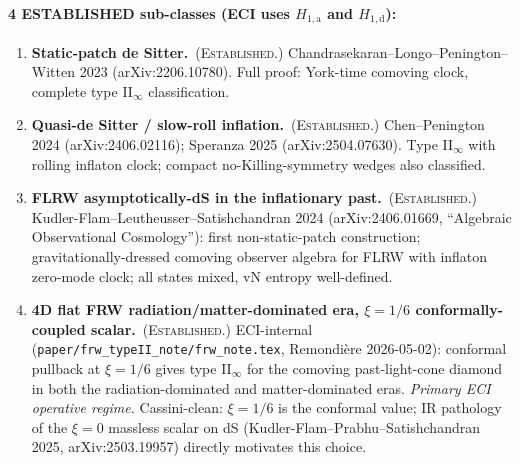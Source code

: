 \documentclass[a4paper,11pt]{article}
\theoremstyle{definition}
\theoremstyle{remark}
\begin{document}
\paragraph{4 ESTABLISHED sub-classes (ECI uses $H_{1,\mathrm{a}}$
           and $H_{1,\mathrm{d}}$):}
\begin{enumerate}
\item[$H_{1,\mathrm{a}}$]
  \textbf{Static-patch de Sitter.}\ (\textsc{Established.})
  Chandrasekaran--Longo--Penington--Witten 2023 \cite{CLPW23}
  (arXiv:2206.10780).  Full proof: York-time comoving clock,
  complete type II$_\infty$ classification.
\item[$H_{1,\mathrm{b}}$]
  \textbf{Quasi-de Sitter / slow-roll inflation.}\ (\textsc{Established.})
  Chen--Penington 2024 (arXiv:2406.02116); Speranza 2025
  (arXiv:2504.07630).  Type II$_\infty$ with rolling inflaton clock;
  compact no-Killing-symmetry wedges also classified.
\item[$H_{1,\mathrm{c}}$]
  \textbf{FLRW asymptotically-dS in the inflationary past.}\
  (\textsc{Established.})
  Kudler-Flam--Leutheusser--Satishchandran 2024 \cite{KFLS24}
  (arXiv:2406.01669, ``Algebraic Observational Cosmology''):
  first non-static-patch construction; gravitationally-dressed
  comoving observer algebra for FLRW with inflaton zero-mode clock;
  all states mixed, vN entropy well-defined.
\item[$H_{1,\mathrm{d}}$]
  \textbf{4D flat FRW radiation/matter-dominated era, $\xi=1/6$
  conformally-coupled scalar.}\ (\textsc{Established.})
  ECI-internal \cite{FRWnote}
  (\texttt{paper/frw\_typeII\_note/frw\_note.tex},
  Remondi\`ere 2026-05-02): conformal pullback at $\xi=1/6$ gives
  type II$_\infty$ for the comoving past-light-cone diamond in both
  the radiation-dominated and matter-dominated eras.
  \emph{Primary ECI operative regime.}
  Cassini-clean: $\xi=1/6$ is the conformal value; IR pathology of
  the $\xi=0$ massless scalar on dS
  (Kudler-Flam--Prabhu--Satishchandran 2025, arXiv:2503.19957)
  directly motivates this choice.
\end{enumerate}
\end{document}

